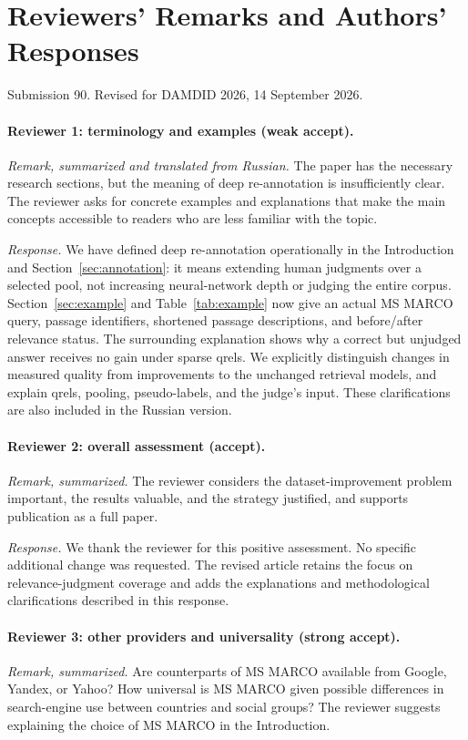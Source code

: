 \section*{Reviewers' Remarks and Authors' Responses}
\label{sec:responses}
\noindent Submission 90. Revised for DAMDID 2026, 14 September 2026.

\paragraph{Reviewer 1: terminology and examples (weak accept).}
\emph{Remark, summarized and translated from Russian.} The paper has the necessary research sections, but the meaning of deep re-annotation is insufficiently clear. The reviewer asks for concrete examples and explanations that make the main concepts accessible to readers who are less familiar with the topic.

\emph{Response.} We have defined deep re-annotation operationally in the Introduction and Section~\ref{sec:annotation}: it means extending human judgments over a selected pool, not increasing neural-network depth or judging the entire corpus. Section~\ref{sec:example} and Table~\ref{tab:example} now give an actual MS MARCO query, passage identifiers, shortened passage descriptions, and before/after relevance status. The surrounding explanation shows why a correct but unjudged answer receives no gain under sparse qrels. We explicitly distinguish changes in measured quality from improvements to the unchanged retrieval models, and explain qrels, pooling, pseudo-labels, and the judge's input. These clarifications are also included in the Russian version.

\paragraph{Reviewer 2: overall assessment (accept).}
\emph{Remark, summarized.} The reviewer considers the dataset-improvement problem important, the results valuable, and the strategy justified, and supports publication as a full paper.

\emph{Response.} We thank the reviewer for this positive assessment. No specific additional change was requested. The revised article retains the focus on relevance-judgment coverage and adds the explanations and methodological clarifications described in this response.

\paragraph{Reviewer 3: other providers and universality (strong accept).}
\emph{Remark, summarized.} Are counterparts of MS MARCO available from Google, Yandex, or Yahoo? How universal is MS MARCO given possible differences in search-engine use between countries and social groups? The reviewer suggests explaining the choice of MS MARCO in the Introduction.

